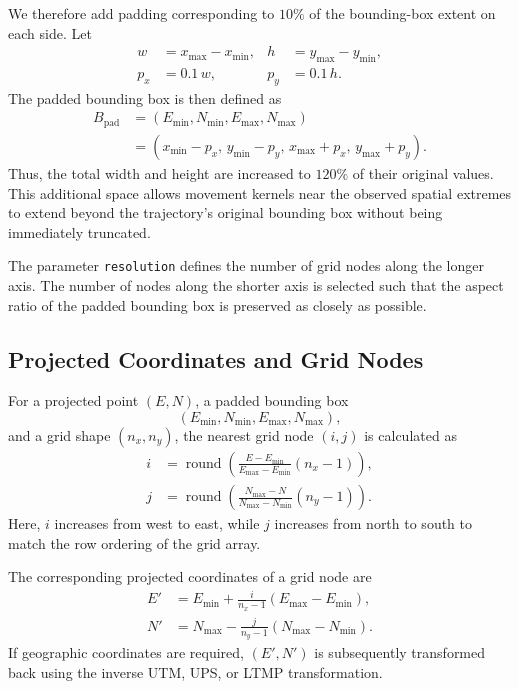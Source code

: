 We therefore add padding corresponding to \(10\%\) of the bounding-box extent on each side. Let
\[
\begin{aligned}
w &= x_{\max}-x_{\min}, &
h &= y_{\max}-y_{\min},\\
p_x &= 0.1\,w, &
p_y &= 0.1\,h.
\end{aligned}
\]
The padded bounding box is then defined as
\[
\begin{aligned}
B_{\mathrm{pad}}
&=
(E_{\min},N_{\min},E_{\max},N_{\max})\\
&=
\left(
x_{\min}-p_x,\,
y_{\min}-p_y,\,
x_{\max}+p_x,\,
y_{\max}+p_y
\right).
\end{aligned}
\]
Thus, the total width and height are increased to \(120\%\) of their original values.
This additional space allows movement kernels near the observed spatial extremes to extend beyond the trajectory's original bounding box without being immediately truncated.

The parameter \texttt{resolution} defines the number of grid nodes along the longer axis.
The number of nodes along the shorter axis is selected such that the aspect ratio of the padded bounding box is preserved as closely as possible.

\subsection{Projected Coordinates and Grid Nodes}
\label{subsec:projected-coordinates-and-grid-nodes}

For a projected point \((E,N)\), a padded bounding box
\[
(E_{\min},N_{\min},E_{\max},N_{\max}),
\]
and a grid shape \((n_x,n_y)\), the nearest grid node \((i,j)\) is calculated as
\[
\begin{aligned}
i &=
\operatorname{round}
\left(
\frac{E-E_{\min}}{E_{\max}-E_{\min}}
(n_x-1)
\right),\\
j &=
\operatorname{round}
\left(
\frac{N_{\max}-N}{N_{\max}-N_{\min}}
(n_y-1)
\right).
\end{aligned}
\]
Here, \(i\) increases from west to east, while \(j\) increases from north to south to match the row ordering of the grid array.

The corresponding projected coordinates of a grid node are
\[
\begin{aligned}
E' &=
E_{\min}
+
\frac{i}{n_x-1}
(E_{\max}-E_{\min}),\\
N' &=
N_{\max}
-
\frac{j}{n_y-1}
(N_{\max}-N_{\min}).
\end{aligned}
\]
If geographic coordinates are required, \((E',N')\) is subsequently transformed back using the inverse UTM, UPS, or LTMP transformation.

